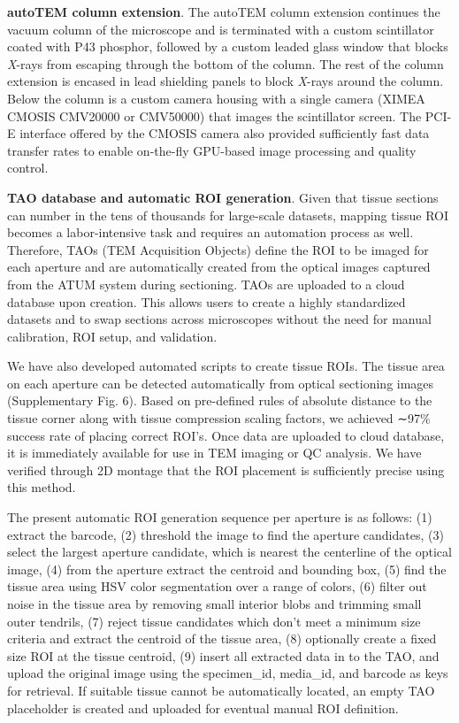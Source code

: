 \documentclass{article}
\begin{document}
{\noindent\textbf{autoTEM column extension}. The autoTEM column extension continues the vacuum column of the microscope and is terminated with a custom scintillator coated with P43 phosphor, followed by a custom leaded glass window that blocks \emph{X}-rays from escaping through the bottom of the column. The rest of the column extension is encased in lead shielding panels to block \emph{X}-rays around the column. Below the column is a custom camera housing with a single camera (XIMEA CMOSIS CMV20000 or CMV50000) that images the scintillator screen. The PCI-E interface offered by the CMOSIS camera also provided sufficiently fast data transfer rates to enable on-the-fly GPU-based image processing and quality control.

\noindent\textbf{TAO database and automatic ROI generation}. Given that tissue sections can number in the tens of thousands for large-scale datasets, mapping tissue ROI becomes a labor-intensive task and requires an automation process as well. Therefore, TAOs (TEM Acquisition Objects) define the ROI to be imaged for each aperture and are automatically created from the optical images captured from the ATUM system during sectioning. TAOs are uploaded to a cloud database upon creation. This allows users to create a highly standardized datasets and to swap sections across microscopes without the need for manual calibration, ROI setup, and validation.

We have also developed automated scripts to create tissue ROIs. The tissue area on each aperture can be detected automatically from optical sectioning images (Supplementary Fig. 6). Based on pre-defined rules of absolute distance to the tissue corner along with tissue compression scaling factors, we achieved ∼97\% success rate of placing correct ROI’s. Once data are uploaded to cloud database, it is immediately available for use in TEM imaging or QC analysis. We have verified through 2D montage that the ROI placement is sufficiently precise using this method.

The present automatic ROI generation sequence per aperture is as follows: (1) extract the barcode, (2) threshold the image to find the aperture candidates, (3) select the largest aperture candidate, which is nearest the centerline of the optical image, (4) from the aperture extract the centroid and bounding box, (5) find the tissue area using HSV color segmentation over a range of colors, (6) filter out noise in the tissue area by removing small interior blobs and trimming small outer tendrils, (7) reject tissue candidates which don’t meet a minimum size criteria and extract the centroid of the tissue area, (8) optionally create a fixed size ROI at the tissue centroid, (9) insert all extracted data in to the TAO, and upload the original image using the specimen\_id, media\_id, and barcode as keys for retrieval. If suitable tissue cannot be automatically located, an empty TAO placeholder is created and uploaded for eventual manual ROI definition.

}
\end{document}
